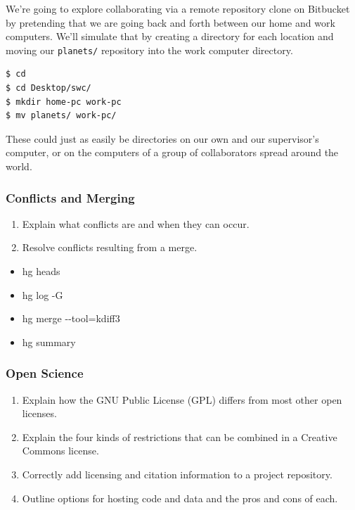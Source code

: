 \documentclass{beamer}
\renewcommand{\dh}{{-}{-}}
\begin{document}
\begin{frame}[fragile]
We're going to explore collaborating via a remote repository clone on Bitbucket by pretending that we are going back and forth between our home and work computers.
We'll simulate that by creating a directory for each location and moving our {\tt planets/} repository into the work computer directory.
\begin{verbatim}
$ cd
$ cd Desktop/swc/
$ mkdir home-pc work-pc
$ mv planets/ work-pc/
\end{verbatim}
These could just as easily be directories on our own and our supervisor's computer,
or on the computers of a group of collaborators spread around the world.
\end{frame}




\begin{frame}
\frametitle{Conflicts and Merging}
\begin{enumerate}
  \item Explain what conflicts are and when they can occur.
  \item Resolve conflicts resulting from a merge.
\end{enumerate}
\begin{multicols}{2}
\begin{itemize}
  \item hg heads
  \item hg log -G
  \item hg merge \dh tool=kdiff3
  \item hg summary
\end{itemize}
\end{multicols}
\end{frame}


\begin{frame}
\frametitle{Open Science}
\begin{enumerate}
  \item Explain how the GNU Public License (GPL) differs from most other open licenses.
  \item Explain the four kinds of restrictions that can be combined in a Creative Commons license.
  \item Correctly add licensing and citation information to a project repository.
  \item Outline options for hosting code and data and the pros and cons of each.
\end{enumerate}
\end{frame}
\end{document}

